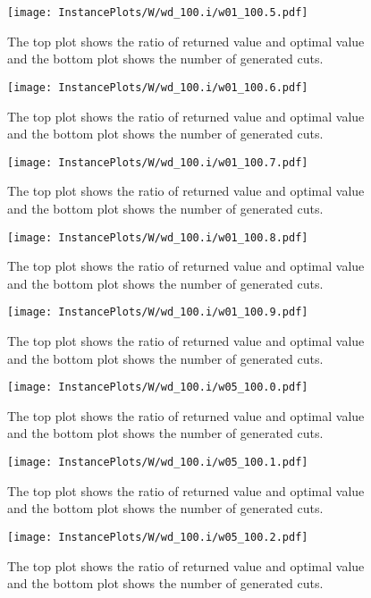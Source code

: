 \documentclass[10pt,a4paper]{article}
\begin{document}
\begin{figure}[H]
\texttt{[image: InstancePlots/W/wd\_100.i/w01\_100.5.pdf]}
\caption{The top plot shows the ratio of returned value and optimal value     and the bottom plot shows the number of generated cuts.}
\end{figure}

\begin{figure}[H]
\texttt{[image: InstancePlots/W/wd\_100.i/w01\_100.6.pdf]}
\caption{The top plot shows the ratio of returned value and optimal value     and the bottom plot shows the number of generated cuts.}
\end{figure}

\begin{figure}[H]
\texttt{[image: InstancePlots/W/wd\_100.i/w01\_100.7.pdf]}
\caption{The top plot shows the ratio of returned value and optimal value     and the bottom plot shows the number of generated cuts.}
\end{figure}

\begin{figure}[H]
\texttt{[image: InstancePlots/W/wd\_100.i/w01\_100.8.pdf]}
\caption{The top plot shows the ratio of returned value and optimal value     and the bottom plot shows the number of generated cuts.}
\end{figure}

\begin{figure}[H]
\texttt{[image: InstancePlots/W/wd\_100.i/w01\_100.9.pdf]}
\caption{The top plot shows the ratio of returned value and optimal value     and the bottom plot shows the number of generated cuts.}
\end{figure}

\begin{figure}[H]
\texttt{[image: InstancePlots/W/wd\_100.i/w05\_100.0.pdf]}
\caption{The top plot shows the ratio of returned value and optimal value     and the bottom plot shows the number of generated cuts.}
\end{figure}

\begin{figure}[H]
\texttt{[image: InstancePlots/W/wd\_100.i/w05\_100.1.pdf]}
\caption{The top plot shows the ratio of returned value and optimal value     and the bottom plot shows the number of generated cuts.}
\end{figure}

\begin{figure}[H]
\texttt{[image: InstancePlots/W/wd\_100.i/w05\_100.2.pdf]}
\caption{The top plot shows the ratio of returned value and optimal value     and the bottom plot shows the number of generated cuts.}
\end{figure}
\end{document}
